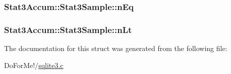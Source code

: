 \hypertarget{struct_stat3_accum_1_1_stat3_sample_a91c387125f80023df372d3c4c19616b3}{
\subsubsection[{n\-Eq}]{ Stat3\-Accum\-::\-Stat3\-Sample\-::n\-Eq}}\label{struct_stat3_accum_1_1_stat3_sample_a91c387125f80023df372d3c4c19616b3}
\hypertarget{struct_stat3_accum_1_1_stat3_sample_aff2cb8657111e4084eea1e10e65938cc}{
\subsubsection[{n\-Lt}]{ Stat3\-Accum\-::\-Stat3\-Sample\-::n\-Lt}}\label{struct_stat3_accum_1_1_stat3_sample_aff2cb8657111e4084eea1e10e65938cc}


The documentation for this struct was generated from the following file\-:\begin{DoxyCompactItemize}
\item 
Do\-For\-Me!/\hyperlink{sqlite3_8c}{sqlite3.\-c}\end{DoxyCompactItemize}
